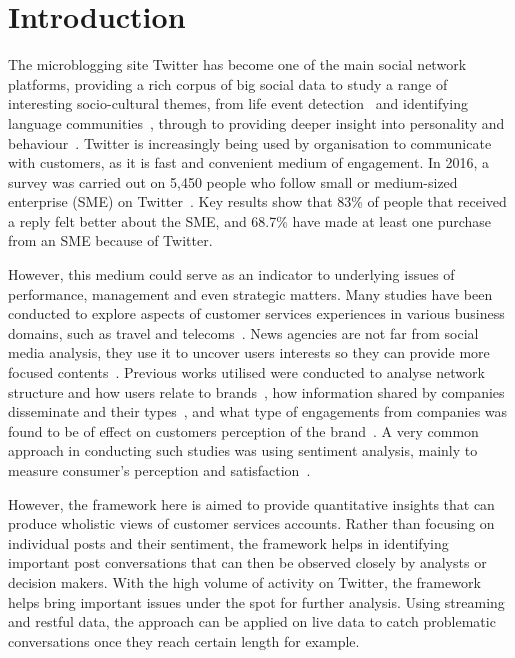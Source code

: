 \documentclass[sigconf]{acmart}
\begin{document}
\maketitle

\section{Introduction}\label{intro}

The microblogging site Twitter has become one of the main social
network platforms, providing a rich corpus of big social data to study
a range of interesting socio-cultural themes, from life event
detection~\cite{blamey-et-al-2013} and identifying language
communities~\cite{albishry-et-al:iccci2017}, through to providing
deeper insight into personality and
behaviour~\cite{mostafa-et-al-ai2016}. Twitter is increasingly being
used by organisation to communicate with customers, as it is fast and
convenient medium of engagement. In 2016, a survey was carried out on
5,450 people who follow small or medium-sized enterprise (SME) on
Twitter~\cite{Twitter2016}. Key results show that 83\% of people that
received a reply felt better about the SME, and 68.7\% have made at
least one purchase from an SME because of Twitter.

However, this medium could serve as an indicator to underlying issues
of performance, management and even strategic matters. Many studies
have been conducted to explore aspects of customer services
experiences in various business domains, such as travel and
telecoms~\cite{Shakeel2017,Zhang2016,Wattimena2017,Guercini2014,Khatoon2017}.
News agencies are not far from social media analysis, they use it to
uncover users interests so they can provide more focused
contents~\cite{Nigam2016}.  Previous works utilised were conducted to
analyse network structure and how users relate to
brands~\cite{Cutler2017}, how information shared by companies
disseminate and their types~\cite{Piccialli2017}, and what type of
engagements from companies was found to be of effect on customers
perception of the brand~\cite{Ibrahim2017}. A very common approach in
conducting such studies was using sentiment analysis, mainly to
measure consumer's perception and
satisfaction~\cite{Zhang2016,Al-Hussaini2017}.

However, the framework here is aimed to provide quantitative insights
that can produce wholistic views of customer services accounts. Rather
than focusing on individual posts and their sentiment, the framework
helps in identifying important post conversations that can then be
observed closely by analysts or decision makers. With the high volume
of activity on Twitter, the framework helps bring important issues
under the spot for further analysis. Using streaming and restful data,
the approach can be applied on live data to catch problematic
conversations once they reach certain length for example.
\end{document}

